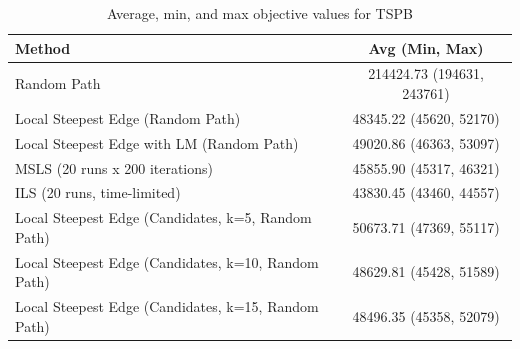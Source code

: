 \begin{table}[h!]
\centering
\begin{tabular}{lc}
\hline
Method & Avg (Min, Max) \\
\hline
Random Path & 214424.73 (194631, 243761) \\
Local Steepest Edge (Random Path) & 48345.22 (45620, 52170) \\
Local Steepest Edge with LM (Random Path) & 49020.86 (46363, 53097) \\
MSLS (20 runs x 200 iterations) & 45855.90 (45317, 46321) \\
ILS (20 runs, time-limited) & 43830.45 (43460, 44557) \\
Local Steepest Edge (Candidates, k=5, Random Path) & 50673.71 (47369, 55117) \\
Local Steepest Edge (Candidates, k=10, Random Path) & 48629.81 (45428, 51589) \\
Local Steepest Edge (Candidates, k=15, Random Path) & 48496.35 (45358, 52079) \\
\hline
\end{tabular}
\caption{Average, min, and max objective values for TSPB}
\label{tab:TSPB_scores}
\end{table}
